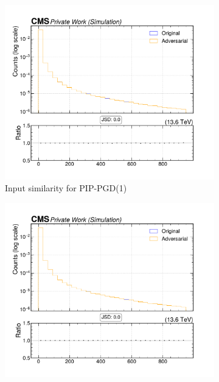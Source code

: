 \begin{figure}[htbp]
  \centering
  \begin{subfigure}[t]{0.32\textwidth}
    \includegraphics[width=\linewidth]{media/output/features/compare/combined_it_1/cmp_cpf_arr_Cpfcan_BtagPf_trackSip3dSig.pdf}
    \caption*{Input similarity for PIP-PGD(1)}
  \end{subfigure}\hfill
  \begin{subfigure}[t]{0.32\textwidth}
    \includegraphics[width=\linewidth]{media/output/features/compare/combined_it_2/cmp_cpf_arr_Cpfcan_BtagPf_trackSip3dSig.pdf}

\end{subfigure}
\end{figure}

